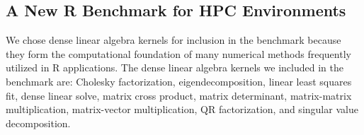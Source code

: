 \subsection{A New R Benchmark for HPC Environments}
We chose dense linear algebra kernels for inclusion in the benchmark
  because they form the computational foundation of many numerical methods
  frequently utilized in R applications.
The dense linear algebra kernels we included in the benchmark are: Cholesky
  factorization, eigendecomposition, linear least squares fit, dense linear
  solve, matrix cross product, matrix determinant, matrix-matrix multiplication,
  matrix-vector multiplication, QR factorization, and singular value
  decomposition.
